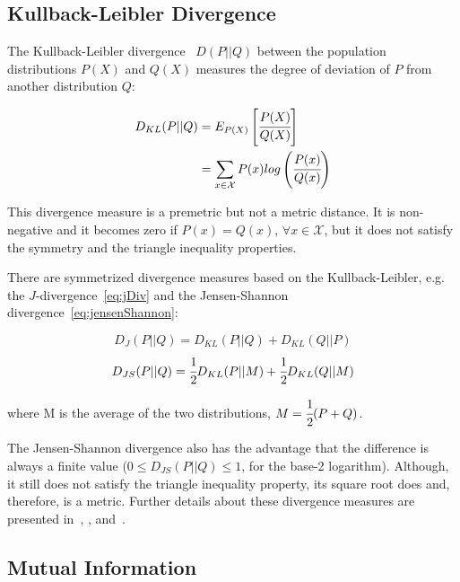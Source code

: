 \subsection{Kullback-Leibler Divergence}
\label{sec:kldiv}

The Kullback-Leibler divergence~\citep{Kullback51klDivergence} $D(P||Q)$ between the population
distributions $P(X)$ and $Q(X)$ measures the degree
of deviation of $P$ from another distribution $Q$:

\begin{equation}
\begin{split}
 D_{KL}(P||Q)&=E_{P(X)}\left[\cfrac{P(X)}{Q(X)}\right] \\
 &=\sum_{x \in \mathcal{X}}P(x)log\left(\cfrac{P(x)}{Q(x)}\right)
\end{split} 
\end{equation}

This divergence measure is a premetric but not a metric distance. It is non-negative and it becomes zero if
$P(x)=Q(x)$,
$\forall x \in \mathcal{X}$, but it does not satisfy the symmetry and the triangle inequality properties.

There are symmetrized divergence measures based on the Kullback-Leibler, e.g. the $J$-divergence~\ref{eq:jDiv} and the
Jensen-Shannon divergence~\ref{eq:jensenShannon}:

\begin{equation} \label{eq:jDiv}
  D_{J}(P||Q) = D_{KL}(P||Q) + D_{KL}(Q||P)
\end{equation}
\begin{equation} \label{eq:jensenShannon}
  D_{JS}(P||Q) = \cfrac{1}{2}D_{KL}(P||M) + \cfrac{1}{2}D_{KL}(Q||M)
\end{equation}

where M is the average of the two distributions, $M=\cfrac{1}{2}(P+Q)$.

The Jensen-Shannon divergence also has the advantage that the difference is always a finite value ($0 \leq
D_{JS}(P||Q) \leq 1$, for the base-2 logarithm). Although, it still does not satisfy the triangle inequality property,
its square root does and, therefore, is a metric. Further details about these divergence measures are presented
in~\citet{17795}, \citet{Vinh:2010:ITM:1953011.1953024}, and~\citet{guiasu1977information}.

\subsection{Mutual Information}

